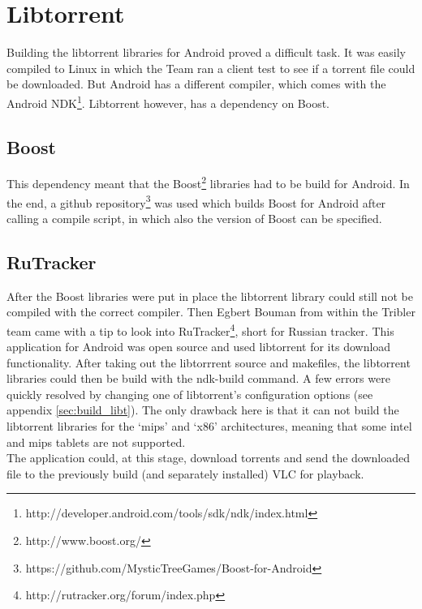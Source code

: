 \chapter{Libtorrent}
\thispagestyle{fancy}
\label{sec:libtorrent_impl}
Building the libtorrent libraries for Android proved a difficult task. It was easily compiled to Linux in which the Team ran a client test to see if a torrent file could be downloaded. But Android has a different compiler, which comes with the Android NDK\footnote{http://developer.android.com/tools/sdk/ndk/index.html}. Libtorrent however, has a dependency on Boost.

\section{Boost}
This dependency meant that the Boost\footnote{http://www.boost.org/} libraries had to be build for Android. In the end, a github repository\footnote{https://github.com/MysticTreeGames/Boost-for-Android} was used which builds Boost for Android after calling a compile script, in which also the version of Boost can be specified.

\section{RuTracker}
After the Boost libraries were put in place the libtorrent library could still not be compiled with the correct compiler. Then Egbert Bouman from within the Tribler team came with a tip to look into RuTracker\footnote{http://rutracker.org/forum/index.php}, short for Russian tracker. This application for Android was open source and used libtorrent for its download functionality. After taking out the libtorrrent source and makefiles, the libtorrent libraries could then be build with the ndk-build command. A few errors were quickly resolved by changing one of libtorrent's configuration options (see appendix \ref{sec:build_libt}). The only drawback here is that it can not build the libtorrent libraries for the `mips' and `x86' architectures, meaning that some intel and mips tablets are not supported.\\ 

The application could, at this stage, download torrents and send the downloaded file to the previously build (and separately installed) VLC for playback.